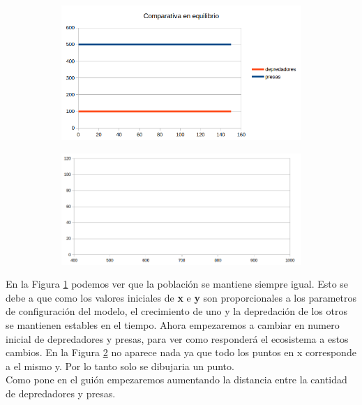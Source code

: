 \documentclass[12pt,a4paper]{article}
\begin{document}
\begin{figure}[H]
	\centering
	\begin{subfigure}{.5\textwidth}
		\centering
	\includegraphics[width=1\linewidth]{images/ejercicio2_1}
		\caption{}
	\label{fig:ejercicio211}
		
	\end{subfigure}%
	\begin{subfigure}{.5\textwidth}
		\centering
	\includegraphics[width=1\linewidth]{images/ejercicio2_1_2}
		\caption{}
	\label{fig:ejercicio212}
	\end{subfigure}
	
	\label{fig:ejercicio21}
\end{figure}
 En la Figura \ref{fig:ejercicio211} podemos ver que la población se mantiene siempre igual. Esto se debe a que como los valores iniciales de \textbf{x} e \textbf{y} son proporcionales a los parametros de configuración del modelo, el crecimiento de uno y la depredación de los otros se mantienen estables en el tiempo. Ahora empezaremos a cambiar en numero inicial de depredadores y presas, para ver como responderá el ecosistema a estos cambios. En la Figura \ref{fig:ejercicio212} no aparece nada ya que todo los puntos en x corresponde a el mismo y. Por lo tanto solo se dibujaria un punto.  		\\Como pone en el guión empezaremos aumentando la distancia entre la cantidad de depredadores y presas.
\end{document}
